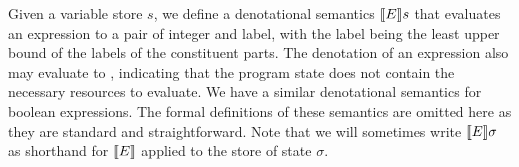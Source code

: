 \begin{comment}
The denotational semantics of expressions is defined as:
\begin{align*}
\den{E} \,\, & : \,\, \text{Store} \rightarrow \text{option Val} \\
\den{x}s & = s(x) \\
\den{c}s & = \some{(c,\lo)} \\
\den{E_1 \ttt{ op } E_2}s & = \left\{
\begin{aligned}
& \some{(v_1 \den{\ttt{op}} v_2, l_1 \sqcup l_2)}, \quad \text{if } \\
& \qquad \left(\begin{aligned}
& \den{E_1}s = \some{(v_1,l_1)} \\
& \text{ and } \, \den{E_2}s = \some{(v_2,l_2)} \\
\end{aligned}\right. \\
& \none, \qquad \text{otherwise}
\end{aligned}\right.
\end{align*}
\end{comment}
Given a variable store $s$, we define a denotational semantics $\llbracket E \rrbracket s$ that evaluates an expression to a pair of 
integer and label, with the label being the least upper bound of the labels of the constituent parts. The denotation 
of an expression also may evaluate to \none{}, indicating that the program state does not contain the necessary 
resources to evaluate. We have a similar denotational semantics for boolean expressions. The formal definitions of 
these semantics are omitted here as they are standard and straightforward. Note that we will sometimes write
 $\llbracket E \rrbracket\sigma$ as shorthand for $\llbracket E \rrbracket$ applied to the store of state $\sigma$.


